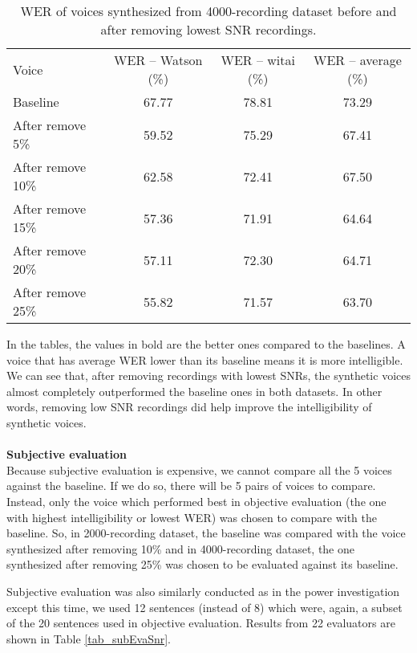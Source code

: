 \documentclass[12pt]{article}
\begin{document}
\begin{table}[]
\begin{center}
\caption{WER of voices synthesized from 4000-recording dataset before and after removing lowest SNR recordings.}
\label{tab_werSnr4000}
\vspace{3mm}
\begin{tabular}{lccc}
\hline
Voice & WER – Watson (\%) & WER – witai (\%) & WER – average (\%)\\
\cmidrule(l{0pt}r{2pt}){1-1}\cmidrule(l{0pt}r{2pt}){2-2}\cmidrule(l{0pt}r{2pt}){3-3}\cmidrule(l{0pt}r{2pt}){4-4}
Baseline          & 67.77 & 78.81 & 73.29 \\
After remove 5\%  & 59.52 & 75.29 & 67.41 \\
After remove 10\% & 62.58 & 72.41 & 67.50 \\
After remove 15\% & 57.36 & 71.91 & 64.64 \\
After remove 20\% & 57.11 & 72.30 & 64.71 \\
After remove 25\% & 55.82 & 71.57 & 63.70 \\
\hline
\end{tabular}
\end{center}
\end{table}

In the tables, the values in bold are the better ones compared to the baselines. A voice that has average WER lower than its baseline means it is more intelligible. We can see that, after removing recordings with lowest SNRs, the synthetic voices almost completely outperformed the baseline ones in both datasets. In other words, removing low SNR recordings did help improve the intelligibility of synthetic voices.\\\\
\textbf{Subjective evaluation}
\vspace{0.28cm}\\
Because subjective evaluation is expensive, we cannot compare all the 5 voices against the baseline. If we do so, there will be 5 pairs of voices to compare. Instead, only the voice which performed best in objective evaluation (the one with highest intelligibility or lowest WER) was chosen to compare with the baseline. So, in 2000-recording dataset, the baseline was compared with the voice synthesized after removing 10\% and in 4000-recording dataset, the one synthesized after removing 25\% was chosen to be evaluated against its baseline.

Subjective evaluation was also similarly conducted as in the power investigation except this time, we used 12 sentences (instead of 8) which were, again, a subset of the 20 sentences used in objective evaluation. Results from 22 evaluators are shown in Table \ref{tab_subEvaSnr}.
\end{document}
